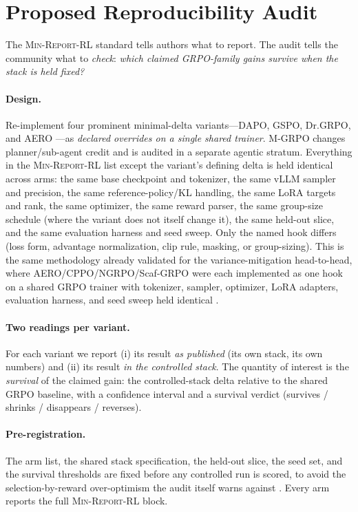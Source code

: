 \documentclass[11pt]{article}
\newcommand{\minreport}{\textsc{Min-Report-RL}}
\begin{document}
\section{Proposed Reproducibility Audit}
\label{sec:audit}


The \minreport{} standard tells authors what to report. The audit tells the
community what to \emph{check}: \emph{which claimed GRPO-family gains survive
when the stack is held fixed?}

\paragraph{Design.}
Re-implement four prominent minimal-delta variants---DAPO, GSPO, Dr.GRPO, and
AERO \cite{yu2025dapo,qwen2025gspo,tong2025drgrpo,zhang2026aero}---as
\emph{declared overrides on a single shared trainer}. M-GRPO
\cite{hong2025mgrpo} changes planner/sub-agent credit and is audited in a
separate agentic stratum. Everything
in the \minreport{} list except the variant's defining delta is held identical
across arms: the same base checkpoint and tokenizer, the same vLLM sampler and
precision, the same reference-policy/KL handling, the same LoRA targets and
rank, the same optimizer, the same reward parser, the same group-size schedule
(where the variant does not itself change it), the same held-out slice, and the
same evaluation harness and seed sweep. Only the named hook differs (loss form,
advantage normalization, clip rule, masking, or group-sizing). This is the same
methodology already validated for the variance-mitigation head-to-head, where
AERO/CPPO/NGRPO/Scaf-GRPO were each implemented as one hook on a shared GRPO
trainer with tokenizer, sampler, optimizer, LoRA adapters, evaluation harness,
and seed sweep held identical \cite{zvfaudit2026}.

\paragraph{Two readings per variant.}
For each variant we report (i) its result \emph{as published} (its own stack,
its own numbers) and (ii) its result \emph{in the controlled stack}. The
quantity of interest is the \emph{survival} of the claimed gain: the
controlled-stack delta relative to the shared GRPO baseline, with a confidence
interval and a survival verdict (survives / shrinks / disappears / reverses).

\paragraph{Pre-registration.}
The arm list, the shared stack specification, the held-out slice, the seed set,
and the survival thresholds are fixed before any controlled run is scored, to
avoid the selection-by-reward over-optimism the audit itself warns against
\cite{zvfaudit2026}. Every arm reports the full \minreport{} block.
\end{document}
